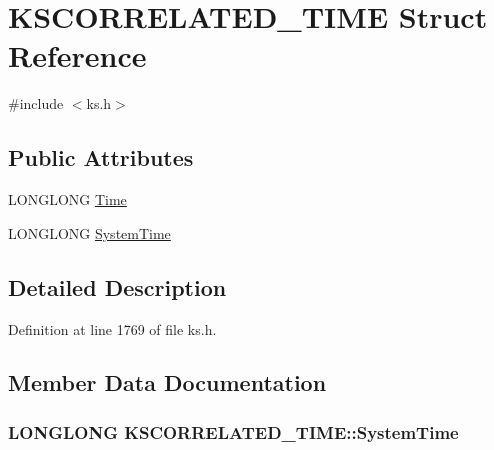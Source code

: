 \hypertarget{struct_k_s_c_o_r_r_e_l_a_t_e_d___t_i_m_e}{}\section{K\+S\+C\+O\+R\+R\+E\+L\+A\+T\+E\+D\+\_\+\+T\+I\+ME Struct Reference}
\label{struct_k_s_c_o_r_r_e_l_a_t_e_d___t_i_m_e}


{\ttfamily \#include $<$ks.\+h$>$}

\subsection*{Public Attributes}
\begin{DoxyCompactItemize}
\item 
L\+O\+N\+G\+L\+O\+NG \hyperlink{struct_k_s_c_o_r_r_e_l_a_t_e_d___t_i_m_e_aebe57472bf750d037da9d79101ae40de}{Time}
\item 
L\+O\+N\+G\+L\+O\+NG \hyperlink{struct_k_s_c_o_r_r_e_l_a_t_e_d___t_i_m_e_aaa96616e901e7357a97a19daee01bb20}{System\+Time}
\end{DoxyCompactItemize}


\subsection{Detailed Description}


Definition at line 1769 of file ks.\+h.



\subsection{Member Data Documentation}
\subsubsection[{\texorpdfstring{System\+Time}{SystemTime}}]{\setlength{\rightskip}{0pt plus 5cm}L\+O\+N\+G\+L\+O\+NG K\+S\+C\+O\+R\+R\+E\+L\+A\+T\+E\+D\+\_\+\+T\+I\+M\+E\+::\+System\+Time}\hypertarget{struct_k_s_c_o_r_r_e_l_a_t_e_d___t_i_m_e_aaa96616e901e7357a97a19daee01bb20}{}\label{struct_k_s_c_o_r_r_e_l_a_t_e_d___t_i_m_e_aaa96616e901e7357a97a19daee01bb20}


